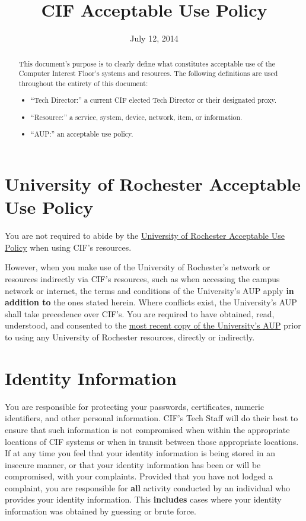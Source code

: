 \documentclass[12pt]{article}
\title{CIF Acceptable Use Policy}
\date{July 12, 2014}
\newcommand{\rochesterAUP}[1]{\href{http://www.resnet.rochester.edu/getstarted/aup.php}{#1}}
\begin{document}
\maketitle

\begin{abstract}
This document's purpose is to clearly define what constitutes acceptable use of the Computer Interest Floor's systems and resources. The following definitions are used throughout the entirety of this document:

\begin{itemize}
	\item ``Tech Director:'' a current CIF elected Tech Director or their designated proxy.
	\item ``Resource:'' a service, system, device, network, item, or information.
	\item ``AUP:'' an acceptable use policy.
\end{itemize}
\end{abstract}

\section{University of Rochester Acceptable Use Policy} %
\label{sec:rochester-aup}

You are not required to abide by the \rochesterAUP{University of Rochester Acceptable Use Policy} when using CIF's resources.

However, when you make use of the University of Rochester's network or resources indirectly via CIF's resources, such as when accessing the campus network or internet, the terms and conditions of the University's AUP apply \textbf{in addition to} the ones stated herein. Where conflicts exist, the University's AUP shall take precedence over CIF's. You are required to have obtained, read, understood, and consented to the \rochesterAUP{most recent copy of the University's AUP} prior to using any University of Rochester resources, directly or indirectly.


\section{Identity Information} %

You are responsible for protecting your passwords, certificates, numeric identifiers, and other personal information. CIF's Tech Staff will do their best to ensure that such information is not compromised when within the appropriate locations of CIF systems or when in transit between those appropriate locations. If at any time you feel that your identity information is being stored in an insecure manner, or that your identity information has been or will be compromised,  with your complaints. Provided that you have not lodged a complaint, you are responsible for \textbf{all} activity conducted by an individual who provides your identity information. This \textbf{includes} cases where your identity information was obtained by guessing or brute force.
\end{document}
